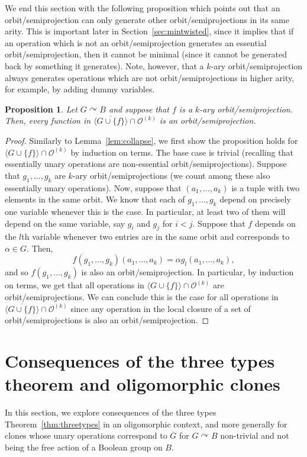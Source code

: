\documentclass{article}
\newtheorem{prop}[theorem]{Proposition}
\theoremstyle{remark}
\theoremstyle{definition}
\def\acts{\curvearrowright}
\begin{document}
We end this section with the following proposition which  points out that an orbit\-/semiprojection can only generate other orbit\-/semiprojections in its same arity. 
This is important later in Section~\ref{sec:mintwisted}, since it implies that if an operation which is not an orbit\-/semiprojection generates an essential orbit\-/semiprojection, then it cannot be minimal (since it cannot be generated back by something it generates). Note, however,  that a $k$-ary orbit\-/semiprojection always generates operations which are not orbit\-/semiprojections in higher arity, for example, by adding dummy variables.

\begin{prop}\label{orbitgen} Let $G\acts B$ and suppose that $f$ is a $k$-ary orbit\-/semiprojection. Then, every function in $\overline{\langle G\cup \{f\}\rangle}\cap \mathcal{O}^{(k)}$ is an %
orbit\-/semiprojection.
\end{prop}
\begin{proof} Similarly to Lemma~\ref{lem:collapse}, we first show the proposition holds for ${\langle G\cup \{f\}\rangle}\cap \mathcal{O}^{(k)}$ by induction on terms. The base case is trivial (recalling that essentially unary operations are non-essential orbit\-/semiprojections). Suppose that $g_1, \dots, g_k$ are $k$-ary orbit\-/semiprojections (we count among these also essentially unary operations). Now, suppose that $(a_1, \dots, a_k)$ is a tuple with two elements in the same orbit. We know that each of $g_1, \dots, g_k$ depend on precisely one variable whenever this is the case. In particular, at least two of them will depend on the same variable, say $g_i$ and $g_j$ for $i<j$. Suppose that $f$ depends on the $l$th variable whenever two entries are in the same orbit and corresponds to $\alpha\in G$. Then, 
    \[f(g_1, \dots, g_k)(a_1, \dots, a_k)=\alpha g_l(a_1, \dots, a_k),\]
    and so $f(g_1, \dots, g_k)$ is also an orbit\-/semiprojection. In particular, by induction on terms, we get that all operations in ${\langle G\cup \{f\}\rangle}\cap \mathcal{O}^{(k)}$ are orbit\-/semiprojections. We can conclude this is the case for all operations in $\overline{\langle G\cup \{f\}\rangle}\cap \mathcal{O}^{(k)}$ since any operation in the local closure of a set of orbit\-/semiprojections is also an orbit\-/semiprojection.
\end{proof}





\section{Consequences of the three types theorem and oligomorphic clones}\label{consequences}
In this section, we explore  consequences of the three types Theorem~\ref{thm:threetypes} in an oligomorphic context, and more generally for clones whose unary operations correspond to $\overline{G}$ for $G\acts B$ non-trivial and not being the free action of a Boolean group on $B$.
\end{document}
